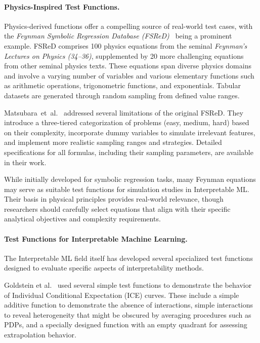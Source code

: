 \documentclass[runningheads]{llncs}
\begin{document}
\paragraph{Physics-Inspired Test Functions.}

Physics-derived functions offer a compelling source of real-world test cases,
with the \textit{Feynman Symbolic Regression Database
    (FSReD)}~\cite{udrescu_ai_2020} being a prominent example. FSReD comprises 100
physics equations from the seminal \textit{Feynman's Lectures on Physics
    (34--36)}, supplemented by 20 more challenging equations from other seminal
physics texts. These equations span diverse physics domains and involve a
varying number of variables and various elementary functions such as arithmetic
operations, trigonometric functions, and exponentials. Tabular datasets are
generated through random sampling from defined value ranges.

Matsubara~et~al.~\cite{matsubara_rethinking_2024} addressed several limitations
of the original FSReD. They introduce a three-tiered categorization of problems
(easy, medium, hard) based on their complexity, incorporate dummy variables to
simulate irrelevant features, and implement more realistic sampling ranges and
strategies. Detailed specifications for all formulas, including their sampling
parameters, are available in their work.

While initially developed for symbolic regression tasks, many Feynman equations
may serve as suitable test functions for simulation studies in Interpretable
ML. Their basis in physical principles provides real-world relevance, though  %
researchers should carefully select equations that align with their specific
analytical objectives and complexity requirements.

\paragraph{Test Functions for Interpretable Machine Learning.}
The Interpretable ML field itself has developed several specialized test
functions designed to evaluate specific aspects of interpretability methods.

Goldstein et al.~\cite{goldstein_peeking_2015} used several simple test
functions to demonstrate the behavior of Individual Conditional Expectation
(ICE) curves. These include a simple additive function to demonstrate the
absence of interactions, simple interactions to reveal heterogeneity that might
be obscured by averaging procedures such as PDPs, and a specially designed
function with an empty quadrant for assessing extrapolation behavior.
\end{document}
